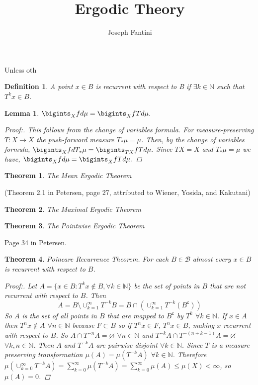 \documentclass{article}
\title{Ergodic Theory}
\author{Joseph Fantini}
\newtheorem{Thm}{Theorem}
\newtheorem{lem}{Lemma}
\newtheorem{mydef}{Definition}
\begin{document}
\maketitle

Unless oth

\begin{mydef}
    A point $x \in B$ is recurrent with respect to B if $\exists k\in \mathbb{N}$ such that $T^kx\in B$.
\end{mydef}

\begin{lem}
$\bigints_X fd\mu = \bigints_X fTd\mu.$
\begin{proof}[Proof:]
    This follows from the change of variables formula. For measure-preserving $T: X \rightarrow X$ the push-forward measure $T_*\mu = \mu$. Then, by the change of variables formula,
    $\bigints_X fdT_*\mu = \bigints_{TX} fTd\mu.$ Since $TX = X$ and $T_*\mu = \mu$ we have,
    $\bigints_X fd\mu = \bigints_{X} fTd\mu.$
\end{proof}
\end{lem}

\begin{Thm}
    The Mean Ergodic Theorem
\end{Thm}

\noindent(Theorem 2.1 in Petersen, page 27, attributed to Wiener, Yosida, and Kakutani)
\begin{Thm}
    The Maximal Ergodic Theorem
\end{Thm}

\begin{Thm}
    The Pointwise Ergodic Theorem
\end{Thm}

\noindent Page 34 in Petersen.
\begin{Thm}
    Poincare Recurrence Theorem. For each $B\in \mathscr{B}$ almost every $x\in B$ is recurrent with respect to $B$.
\begin{proof}[Proof:]
    Let $A = \{x\in B : T^kx \notin B, \forall k \in \mathbb{N}\}$ be the set of points in $B$ that are not recurrent with respect to $B$. Then
    \begin{equation*}
        A = B\setminus \cup_{k=1}^\infty T^{-k}B = B\cap(\cup_{k=1}^\infty T^{-k}(B^\mathsf{c}))
    \end{equation*}
    So $A$ is the set of all points in $B$ that are mapped to $B^\mathsf{c}$ by $T^k$ $\forall k\in\mathbb{N}$. If $x\in A$ then $T^nx\notin A$ $\forall n\in\mathbb{N}$ because $F \subset B$ so if $T^nx \in F$, $T^nx \in B$, making $x$ recurrent with respect to $B$. So $A\cap T^{-n}A = \varnothing$ $\forall n\in\mathbb{N}$ and $T^{-k}A\cap T^{-(n+k-1)}A = \varnothing$ $\forall k,n \in \mathbb{N}$. Then $A$ and $T^{-k}A$ are pairwise disjoint $\forall k\in\mathbb{N}$. Since $T$ is a measure preserving transformation $\mu(A)=\mu(T^{-k}A)$ $\forall k\in\mathbb{N}$. Therefore $\mu(\cup_{k=0}^\infty T^{-k}A) = \sum_{k=0}^\infty \mu(T^{-k}A) = \sum_{k=0}^\infty\mu(A) \leq \mu(X) < \infty$, so $\mu(A) = 0$. 
\end{proof}
\end{Thm}
\end{document}
